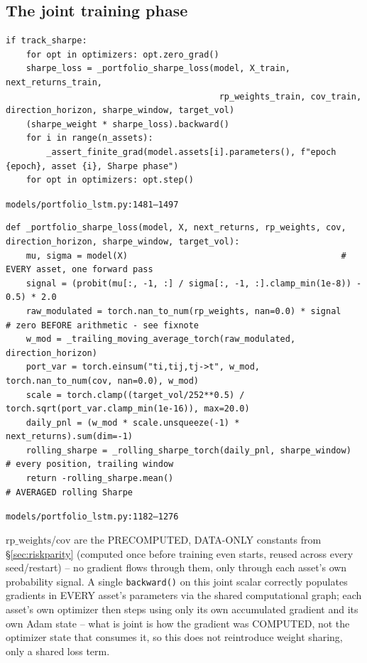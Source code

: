 \documentclass[11pt]{article}
\newcommand{\srcref}[1]{\hfill\textcolor{cmtcolor}{\footnotesize\texttt{#1}}}
\newcommand{\code}[1]{\texttt{\small #1}}
\begin{document}
\subsection{The joint training phase}

\begin{lstlisting}[caption={Phase B - one shared backward() across every asset's parameters.}, label=lst:sharpephase]
if track_sharpe:
    for opt in optimizers: opt.zero_grad()
    sharpe_loss = _portfolio_sharpe_loss(model, X_train, next_returns_train,
                                          rp_weights_train, cov_train, direction_horizon, sharpe_window, target_vol)
    (sharpe_weight * sharpe_loss).backward()
    for i in range(n_assets):
        _assert_finite_grad(model.assets[i].parameters(), f"epoch {epoch}, asset {i}, Sharpe phase")
    for opt in optimizers: opt.step()
\end{lstlisting}
\srcref{models/portfolio\_lstm.py:1481--1497}

\begin{lstlisting}[caption={The differentiable, JOINT negative averaged rolling Sharpe.}, label=lst:sharpeloss]
def _portfolio_sharpe_loss(model, X, next_returns, rp_weights, cov, direction_horizon, sharpe_window, target_vol):
    mu, sigma = model(X)                                          # EVERY asset, one forward pass
    signal = (probit(mu[:, -1, :] / sigma[:, -1, :].clamp_min(1e-8)) - 0.5) * 2.0
    raw_modulated = torch.nan_to_num(rp_weights, nan=0.0) * signal          # zero BEFORE arithmetic - see fixnote
    w_mod = _trailing_moving_average_torch(raw_modulated, direction_horizon)
    port_var = torch.einsum("ti,tij,tj->t", w_mod, torch.nan_to_num(cov, nan=0.0), w_mod)
    scale = torch.clamp((target_vol/252**0.5) / torch.sqrt(port_var.clamp_min(1e-16)), max=20.0)
    daily_pnl = (w_mod * scale.unsqueeze(-1) * next_returns).sum(dim=-1)
    rolling_sharpe = _rolling_sharpe_torch(daily_pnl, sharpe_window)         # every position, trailing window
    return -rolling_sharpe.mean()                                            # AVERAGED rolling Sharpe
\end{lstlisting}
\srcref{models/portfolio\_lstm.py:1182--1276}

$\text{rp\_weights}$/$\text{cov}$ are the PRECOMPUTED, DATA-ONLY constants from
\S\ref{sec:riskparity} (computed once before training even starts, reused across every
seed/restart) -- no gradient flows through them, only through each asset's own probability
signal. A single \code{backward()} on this joint scalar correctly populates gradients in
EVERY asset's parameters via the shared computational graph; each asset's own optimizer then
steps using only its own accumulated gradient and its own Adam state -- what is joint is how
the gradient was COMPUTED, not the optimizer state that consumes it, so this does not
reintroduce weight sharing, only a shared loss term.
\end{document}
